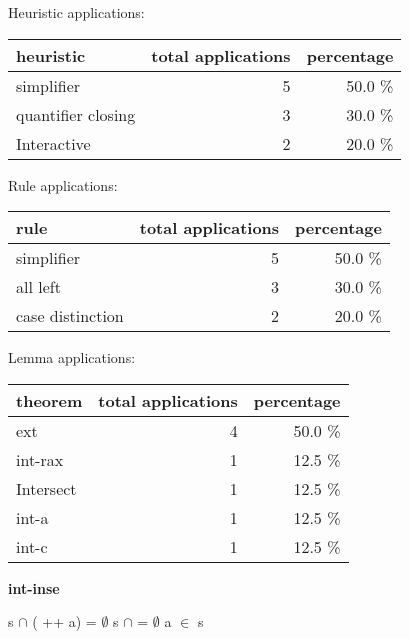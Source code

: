 \documentclass[a4paper]{article}
\begin{document}
\medskip


Heuristic applications:

\begin{supertabular}{l|r|r}
heuristic	& total applications & percentage \\ \hline
simplifier & 5 & 50.0 \% \\
quantifier closing & 3 & 30.0 \% \\
Interactive & 2 & 20.0 \% \\

\end{supertabular}

Rule applications:

\begin{supertabular}{l|r|r}
rule	        & total applications & percentage \\ \hline
simplifier & 5 & 50.0 \% \\
all left & 3 & 30.0 \% \\
case distinction & 2 & 20.0 \% \\

\end{supertabular}

Lemma applications:

\begin{supertabular}{l|r|r}
theorem	        & total applications & percentage \\ \hline
ext & 4 & 50.0 \% \\
int-rax & 1 & 12.5 \% \\
Intersect & 1 & 12.5 \% \\
int-a & 1 & 12.5 \% \\
int-c & 1 & 12.5 \% \\

\end{supertabular}
\pagebreak

{\LARGE\bf int-inse}\label{lemma-int-inse}

\medskip

 \Fol s $\cap$ ( ++ a) = $\emptyset$ \Imp s $\cap$  = $\emptyset$ \And \Not a $\in$ s
\end{document}
